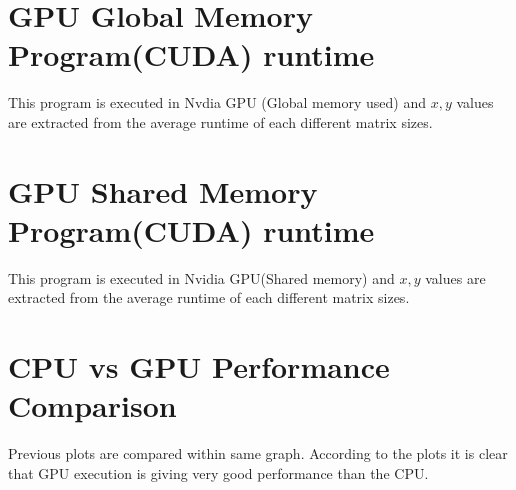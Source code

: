 \documentclass[12pt,oneside,a4paper]{article}
\begin{document}
	\section{GPU Global Memory Program(CUDA) runtime}

	\par
	This program is executed in Nvdia GPU (Global memory used) and $x,y$ values are extracted from the average runtime of each different matrix sizes.
	\hfill \break


	\newpage

	\section{GPU Shared Memory Program(CUDA) runtime}

	\par
	This program is executed in Nvidia GPU(Shared memory) and $x,y$ values are extracted from the average runtime of each different matrix sizes.
	\hfill \break


	\newpage

	\section{CPU vs GPU Performance Comparison}

	\par
	Previous plots are compared within same graph. According to the plots it is clear that GPU execution is giving very good performance than the CPU.  
	\hfill \break
\end{document}
